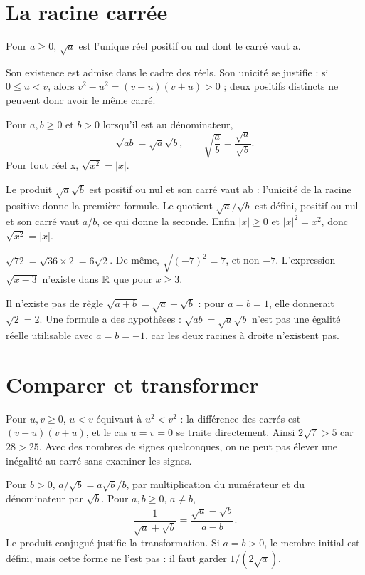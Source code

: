 \documentclass[../cours_2de.tex]{subfiles}
\begin{document}
\section{La racine carrée}
\begin{definition}
Pour $a\ge0$, $\sqrt a$ est l'unique réel positif ou nul dont le carré vaut a.
\end{definition}
Son existence est admise dans le cadre des réels. Son unicité se justifie : si $0\le u<v$, alors $v^2-u^2=(v-u)(v+u)>0$ ; deux positifs distincts ne peuvent donc avoir le même carré.
\begin{propriete}
Pour $a,b\ge0$ et $b>0$ lorsqu'il est au dénominateur,
\[
\sqrt{ab}=\sqrt a\sqrt b,\qquad
\sqrt{\frac ab}=\frac{\sqrt a}{\sqrt b}.
\]
Pour tout réel x, $\sqrt{x^2}=|x|$.
\end{propriete}
\begin{demonstration}
Le produit $\sqrt a\sqrt b$ est positif ou nul et son carré vaut ab : l'unicité de la racine positive donne la première formule. Le quotient $\sqrt a/\sqrt b$ est défini, positif ou nul et son carré vaut $a/b$, ce qui donne la seconde. Enfin $|x|\ge0$ et $|x|^2=x^2$, donc $\sqrt{x^2}=|x|$.
\end{demonstration}
\begin{exemple}
$\sqrt{72}=\sqrt{36\times2}=6\sqrt2$. De même, $\sqrt{(-7)^2}=7$, et non $-7$. L'expression $\sqrt{x-3}$ n'existe dans $\mathbb{R}$ que pour $x\ge3$.
\end{exemple}
\begin{attention}
Il n'existe pas de règle $\sqrt{a+b}=\sqrt a+\sqrt b$ : pour $a=b=1$, elle donnerait $\sqrt2=2$. Une formule a des hypothèses : $\sqrt{ab}=\sqrt a\sqrt b$ n'est pas une égalité réelle utilisable avec $a=b=-1$, car les deux racines à droite n'existent pas.
\end{attention}
\section{Comparer et transformer}
Pour $u,v\ge0$, $u<v$ équivaut à $u^2<v^2$ : la différence des carrés est $(v-u)(v+u)$, et le cas $u=v=0$ se traite directement. Ainsi $2\sqrt7>5$ car $28>25$. Avec des nombres de signes quelconques, on ne peut pas élever une inégalité au carré sans examiner les signes.

\approfondissement Pour $b>0$, $a/\sqrt b=a\sqrt b/b$, par multiplication du numérateur et du dénominateur par $\sqrt b$. Pour $a,b\ge0$, $a\ne b$,
\[
\frac1{\sqrt a+\sqrt b}=\frac{\sqrt a-\sqrt b}{a-b}.
\]
Le produit conjugué justifie la transformation. Si $a=b>0$, le membre initial est défini, mais cette forme ne l'est pas : il faut garder $1/(2\sqrt a)$.
\end{document}
